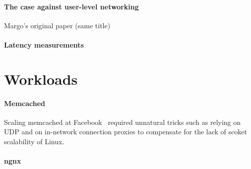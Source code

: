 \paragraph{The case against user-level networking}
Margo's original paper (same title)~\cite{magoutis2004case}

\paragraph*{Latency measurements}  

\section{Workloads}

\paragraph*{Memcached} 
Scaling memcached at Facebook~\cite{nishtala2013scaling} required
unnatural tricks such as relying on UDP and on in-network connection
proxies to compensate for the lack of scoket scalability of Linux.


\paragraph*{ngnx}
